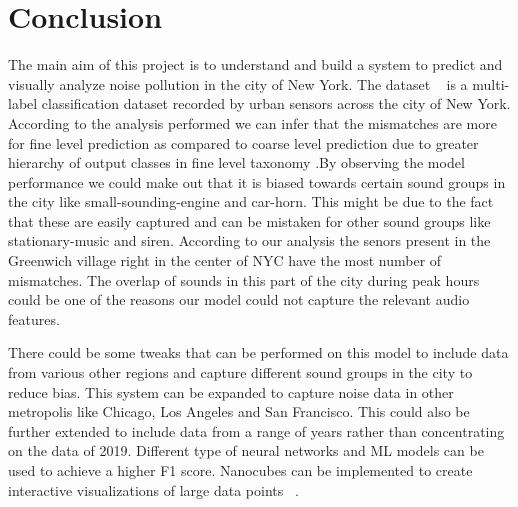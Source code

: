 
	\section{Conclusion}
	The main aim of this project is to understand and build a system to predict and visually analyze noise pollution in the city of New York.
	The dataset ~\cite{7} is a multi-label classification dataset recorded by urban sensors across the city of New York.
	According to the analysis performed we can infer that the mismatches are more for fine level prediction as compared to coarse level prediction due to greater hierarchy of output classes in fine level taxonomy .By observing the model performance we could make out that it is biased towards certain sound groups in the city like small-sounding-engine and car-horn. This might be due to the fact that these are easily captured and can be mistaken for other sound groups like stationary-music and siren. According to our analysis the senors present in the Greenwich village right in the center of NYC have the most number of mismatches.  The overlap of sounds in this part of the city during peak hours could be one of the reasons our model could not capture the relevant audio features.
	
	There could be some tweaks that can be performed on this model to include data from various other regions and capture different sound groups in the city to reduce bias. This system can be expanded to capture noise data in other metropolis like Chicago, Los Angeles and San Francisco. This could also be further extended to include data from a range of years rather than concentrating on the data of 2019. Different type of neural networks and ML models can be used to achieve a higher F1 score. Nanocubes can be implemented to create interactive visualizations of large data points ~\cite{9}.
	

